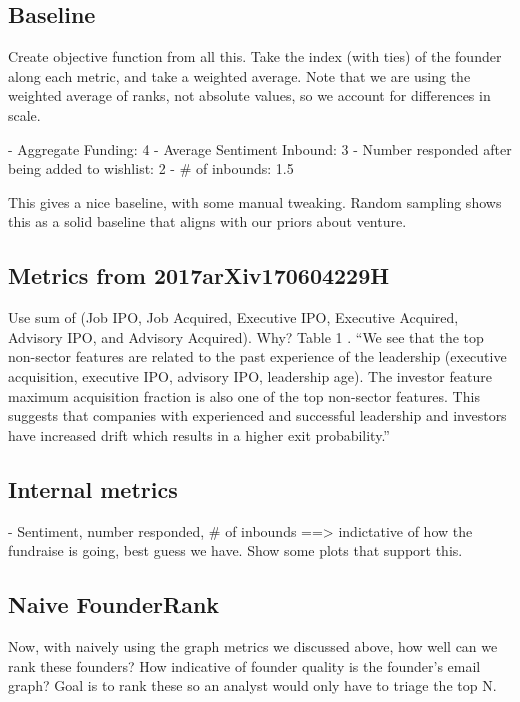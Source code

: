 \subsection{Baseline}

Create objective function from all this. Take the index (with ties) of the founder along each metric, and take a weighted average. Note that we are using the weighted average of ranks, not absolute values, so we account for differences in scale.

- Aggregate Funding: 4
- Average Sentiment Inbound: 3
- Number responded after being added to wishlist: 2
- \# of inbounds: 1.5

This gives a nice baseline, with some manual tweaking. Random sampling shows this as a solid baseline that aligns with our priors about venture.

\subsection{Metrics from 2017arXiv170604229H}

Use sum of (Job IPO, Job Acquired, Executive IPO, Executive Acquired, Advisory IPO, and Advisory Acquired). Why? Table 1 \cite{2017arXiv170604229H}. ``We see that the top non-sector features are related to the past experience of the leadership (executive acquisition, executive IPO, advisory IPO, leadership age). The investor feature maximum acquisition fraction is also one of the top non-sector features. This suggests that companies with experienced and successful leadership and investors have increased drift which results in a higher exit probability.''

\subsection{Internal metrics}

- Sentiment, number responded, \# of inbounds ==> indictative of how the fundraise is going, best guess we have. Show some plots that support this.

\subsection{Naive FounderRank}

Now, with naively using the graph metrics we discussed above, how well can we rank these founders? How indicative of founder quality is the founder's email graph? Goal is to rank these so an analyst would only have to triage the top N.

